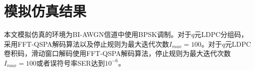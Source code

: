 \chapter{模拟仿真结果}
本文模拟仿真的环境为BI-AWGN信道中使用BPSK调制。对于$q$元LDPC分组码，采用FFT-QSPA解码算法以及停止规则为最大迭代次数$I_{max}=100$。对于$q$元LDPC卷积码，滑动窗口解码使用FFT-QSPA解码算法，停止规则为最大迭代次数$I_{max}=100$或者误符号率SER达到$10^{-6}$。